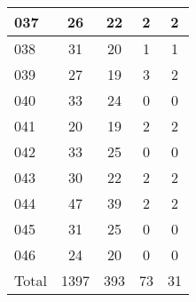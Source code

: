 \begin{center}
\begin{longtable}{l|c|c|c|c}
037 & 26 & 22 & 2 & 2\\ \hline
038 & 31 & 20 & 1 & 1\\ \hline
039 & 27 & 19 & 3 & 2\\ \hline
040 & 33 & 24 & 0 & 0\\ \hline
041 & 20 & 19 & 2 & 2\\ \hline
042 & 33 & 25 & 0 & 0\\ \hline
043 & 30 & 22 & 2 & 2\\ \hline
044 & 47 & 39 & 2 & 2\\ \hline
045 & 31 & 25 & 0 & 0\\ \hline
046 & 24 & 20 & 0 & 0\\ \hline
\hline \hline
Total & 1397 & 393 & 73 & 31



\end{longtable}
\end{center}
 
 



\scriptsize



